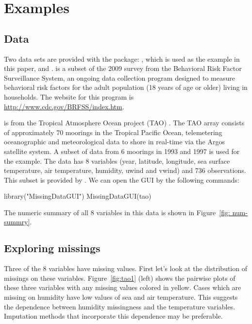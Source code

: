 \documentclass[article]{jss}
\begin{document}
\section{Examples}\label{Examples}

\subsection{Data}

Two data sets are provided with the package: , which is used as the example in this paper, and .  is a subset of the 2009 survey from the Behavioral Risk Factor Surveillance System, an ongoing data collection program designed to measure behavioral risk factors for the adult population (18 years of age or older) living in households. The website for this program is \url{http://www.cdc.gov/BRFSS/index.htm}.

 is from the Tropical Atmosphere Ocean project (TAO) \citep{tao}. The TAO array consists of approximately 70 moorings in the Tropical Pacific Ocean, telemetering oceanographic and meteorological data to shore in real-time via the Argos satellite system. A subset of data from 6 moorings in 1993 and 1997 is used for the example. The data has 8 variables (year, latitude, longitude, sea surface temperature, air temperature, humidity, uwind and vwind) and 736 observations. This subset is provided by \citet{CS07}. We can open the GUI by the following commands:

\begin{Code}
library("MissingDataGUI")
MissingDataGUI(tao)
\end{Code}

The numeric summary of all 8 variables in this data is shown in Figure~\ref{fig: num-summry}.



\subsection{Exploring missings}

Three of the 8 variables have missing values. First let's look at the distribution of missings on these variables. Figure~\ref{fig:tao1} (left) shows the pairwise plots of these three variables with any missing values colored in yellow. Cases which are missing on humidity have low values of sea and air temperature. This suggests the dependence between humidity missingness and the temperature variables. Imputation methods that incorporate this dependence may be preferable.
\end{document}
